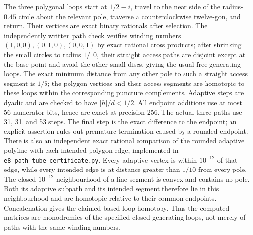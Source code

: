 The three polygonal loops start at $1/2-i$, travel to the near side
of the radius-$0.45$ circle about the relevant pole, traverse a
counterclockwise twelve-gon, and return. Their vertices are exact
binary rationals after selection. The independently written path
check verifies winding numbers $(1,0,0),(0,1,0),(0,0,1)$ by exact
rational cross products; after shrinking the small circles to radius $1/10$, their straight
access paths are disjoint except at the base point and avoid the other
small discs, giving the usual free generating loops. The exact minimum
distance from any other pole to such a straight access segment is
$1/5$; the polygon vertices and their access segments are homotopic
to these loops within the corresponding puncture complements. Adaptive steps
are dyadic and are checked to have $|h|/d<1/2$. All endpoint
additions use at most 56 numerator bits, hence are exact at precision
256. The actual three paths use 31, 31, and 53 steps. The final step
is the exact difference to the endpoint; an explicit assertion rules
out premature termination caused by a rounded endpoint.
There is also an independent exact rational comparison of the rounded
adaptive polyline with each intended polygon edge, implemented in
\texttt{e8\_path\_tube\_certificate.py}. Every adaptive vertex is
within $10^{-12}$ of that edge, while every intended edge is at
distance greater than $1/10$ from every pole. The closed
$10^{-12}$-neighbourhood of a line segment is convex and contains
no pole. Both its adaptive subpath and its intended segment therefore
lie in this neighbourhood and are homotopic relative to their common
endpoints. Concatenation gives the claimed based-loop homotopy.
Thus the computed matrices are monodromies of the specified closed
generating loops, not merely of paths with the same winding numbers.

